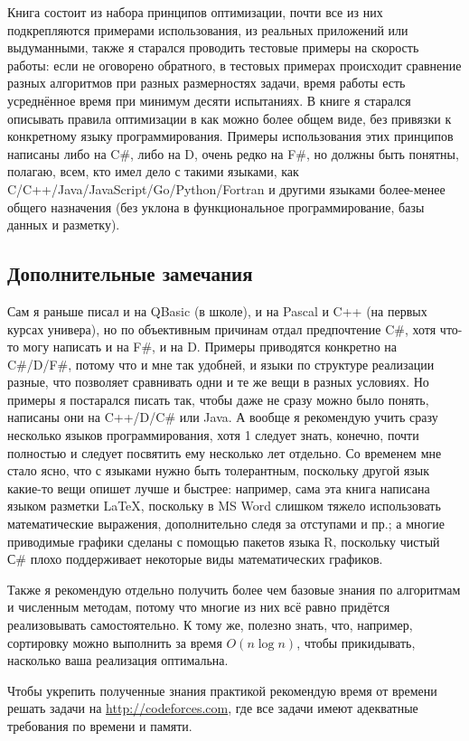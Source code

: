 \documentclass[a4paper, 12pt]{article}
\begin{document}
Книга состоит из набора принципов оптимизации, почти все из них подкрепляются примерами использования, из реальных приложений или выдуманными, также я старался проводить тестовые примеры на скорость работы: если не оговорено обратного, в тестовых примерах происходит сравнение разных алгоритмов при разных размерностях задачи, время работы есть усреднённое время при минимум десяти испытаниях.
В книге я старался описывать правила оптимизации в как можно более общем виде, без привязки к конкретному языку программирования.
Примеры использования этих принципов написаны либо на C\#, либо на D, очень редко на F\#, но должны быть понятны, полагаю, всем, кто имел дело с такими языками, как C/C++/Java/JavaScript/Go/Python/Fortran и другими языками более-менее общего назначения (без уклона в функциональное программирование, базы данных и разметку).

\subsection*{Дополнительные замечания}
Сам я раньше писал и на QBasic (в школе), и на Pascal и C++ (на первых курсах универа), но по объективным причинам отдал предпочтение C\#, хотя что-то могу написать и на F\#, и на D.
Примеры приводятся конкретно на C\#/D/F\#, потому что и мне так удобней, и языки по структуре реализации разные, что позволяет сравнивать одни и те же вещи в разных условиях.
Но примеры я постарался писать так, чтобы даже не сразу можно было понять, написаны они на C++/D/C\# или Java. А вообще я рекомендую учить сразу несколько языков программирования, хотя 1 следует знать, конечно, почти полностью и следует посвятить ему несколько лет отдельно.
Со временем мне стало ясно, что с языками нужно быть толерантным, поскольку другой язык какие-то вещи опишет лучше и быстрее: например, сама эта книга написана языком разметки \LaTeX, поскольку в MS Word слишком тяжело использовать математические выражения, дополнительно следя за отступами и пр.; а многие приводимые графики сделаны с помощью пакетов языка R, поскольку чистый С\# плохо поддерживает некоторые виды математических графиков.

Также я рекомендую отдельно получить более чем базовые знания по алгоритмам и численным методам, потому что многие из них всё равно придётся реализовывать самостоятельно. К тому же, полезно знать, что, например, сортировку можно выполнить за время $O(n \log n)$, чтобы прикидывать, насколько ваша реализация оптимальна.

Чтобы укрепить полученные знания практикой рекомендую время от времени решать задачи на \url{http://codeforces.com}, где все задачи имеют адекватные требования по времени и памяти.
\end{document}
